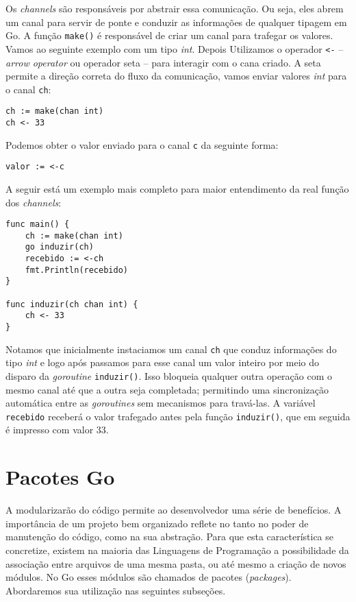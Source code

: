 \documentclass{SBCbookchapter}
\begin{document}
Os \textit{channels} são responsáveis por abstrair essa comunicação. Ou seja, eles abrem um canal para servir de ponte e conduzir as informações de qualquer tipagem em Go. A função \texttt{make()} é responsável de criar um canal para trafegar os valores. Vamos ao seguinte exemplo com um tipo \textit{int}. Depois Utilizamos o operador \texttt{<-} -- \textit{arrow operator} ou operador seta -- para interagir com o cana criado. A seta permite a direção correta do fluxo da comunicação, vamos enviar valores \textit{int} para o canal \texttt{ch}:

\begin{lstlisting}
ch := make(chan int)
ch <- 33
\end{lstlisting}


Podemos obter o valor enviado para o canal \texttt{c} da seguinte forma:

\begin{lstlisting}
valor := <-c
\end{lstlisting}

A seguir está um exemplo mais completo para maior entendimento da real função dos \textit{channels}:

\begin{lstlisting}
func main() {
	ch := make(chan int)
	go induzir(ch)
	recebido := <-ch
	fmt.Println(recebido)
}

func induzir(ch chan int) {
	ch <- 33
}
\end{lstlisting}

Notamos que inicialmente instaciamos um canal \texttt{ch} que conduz informações do tipo \textit{int} e logo após passamos para esse canal um valor inteiro por meio do disparo da \textit{goroutine} \texttt{induzir()}. Isso bloqueia qualquer outra operação com o mesmo canal até que a outra seja completada; permitindo uma sincronização automática entre as \textit{goroutines} sem mecanismos para travá-las. A variável \texttt{recebido} receberá o valor trafegado antes pela função \texttt{induzir()}, que em seguida é impresso com valor 33.
\section{Pacotes Go}

A modularizarão do código permite ao desenvolvedor uma série de benefícios. A importância de um projeto bem organizado reflete no tanto no poder de manutenção do código, como na sua abstração. Para que esta característica se concretize, existem na maioria das Linguagens de Programação a possibilidade da associação entre arquivos de uma mesma pasta, ou até mesmo a criação de novos módulos. No Go esses módulos são chamados de pacotes (\textit{packages}). Abordaremos sua utilização nas seguintes subseções.
\end{document}

